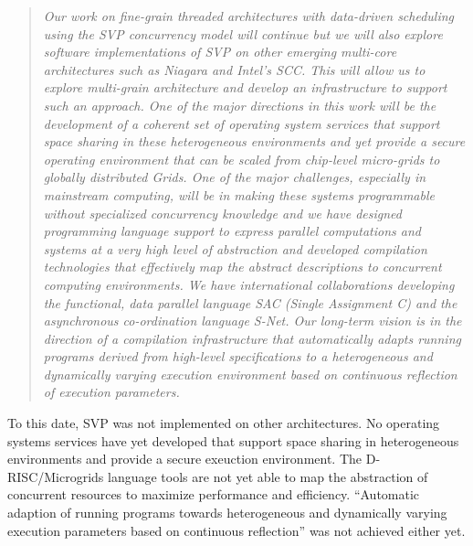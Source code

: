 \begin{quote}
\itshape
Our work on fine-grain threaded architectures with data-driven
scheduling using the SVP concurrency model will continue but we will
also explore software implementations of SVP on other emerging
multi-core architectures such as Niagara and Intel's SCC. This will
allow us to explore multi-grain architecture and develop an
infrastructure to support such an approach. One of the major
directions in this work will be the development of a coherent set of
operating system services that support space sharing in these
heterogeneous environments and yet provide a secure operating
environment that can be scaled from chip-level micro-grids to globally
distributed Grids.  One of the major challenges, especially in
mainstream computing, will be in making these systems programmable
without specialized concurrency knowledge and we have designed
programming language support to express parallel computations and
systems at a very high level of abstraction and developed compilation
technologies that effectively map the abstract descriptions to
concurrent computing environments. We have international
collaborations developing the functional, data parallel language SAC
(Single Assignment C) and the asynchronous co-ordination language
S-Net. Our long-term vision is in the direction of a compilation
infrastructure that automatically adapts running programs derived from
high-level specifications to a heterogeneous and dynamically varying
execution environment based on continuous reflection of execution
parameters.
\end{quote}

To this date, SVP was not implemented on other architectures. No
operating systems services have yet developed that support space
sharing in heterogeneous environments and provide a secure exeuction
environment. The D-RISC/Microgrids language tools are not yet able to
map the abstraction of concurrent resources to maximize performance
and efficiency. ``Automatic adaption of running programs towards
heterogeneous and dynamically varying execution parameters based
on continuous reflection'' was not achieved either yet.

